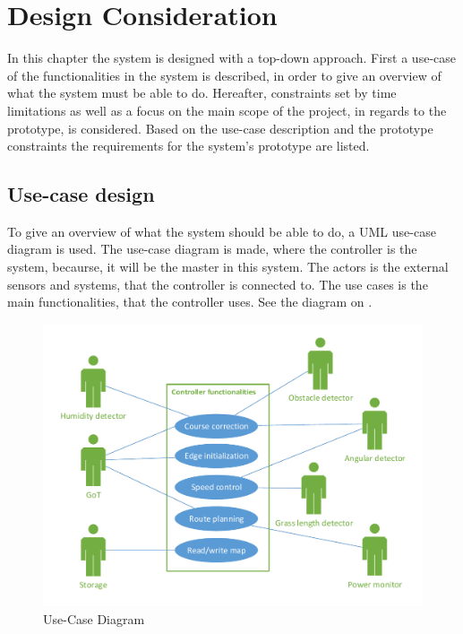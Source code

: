 \chapter{Design Consideration}
\vspace{-5 mm}
In this chapter the system is designed with a top-down approach. First a use-case of the functionalities in the system is described, in order to give an overview of what the system must be able to do. Hereafter, constraints set by time limitations as well as a focus on the main scope of the project, in regards to the prototype, is considered. Based on the use-case description and the prototype constraints the requirements for the system's prototype are listed.
\vspace{-4 mm}
\section{Use-case design}
To give an overview of what the system should be able to do, a UML use-case diagram is used. The use-case diagram is made, where the controller is the system, becaurse, it will be the master in this system. The actors is the external sensors and systems, that the controller is connected to. The use cases is the main functionalities, that the controller uses. See the diagram on . 
\vspace{-3 mm}
 \begin{figure}[H]
	\centering
	\includegraphics[scale=0.8]{figures/P5UseCase.pdf}
	\caption{Use-Case Diagram}
	\label{fig:usecase}
\end{figure}

